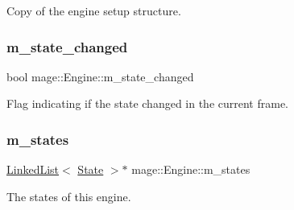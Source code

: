 Copy of the engine setup structure. \hypertarget{classmage_1_1_engine_a2f6f5d3708b6d2a9a4305425e797f309}{}\label{classmage_1_1_engine_a2f6f5d3708b6d2a9a4305425e797f309} 
\subsubsection{\texorpdfstring{m\+\_\+state\+\_\+changed}{m\_state\_changed}}
{\footnotesize\ttfamily bool mage\+::\+Engine\+::m\+\_\+state\+\_\+changed\hspace{0.3cm}{\ttfamily [private]}}

Flag indicating if the state changed in the current frame. \hypertarget{classmage_1_1_engine_a22f39406fcbbbac266baabb14b4e3d70}{}\label{classmage_1_1_engine_a22f39406fcbbbac266baabb14b4e3d70} 
\subsubsection{\texorpdfstring{m\+\_\+states}{m\_states}}
{\footnotesize\ttfamily \hyperlink{classmage_1_1_linked_list}{Linked\+List}$<$ \hyperlink{classmage_1_1_state}{State} $>$$\ast$ mage\+::\+Engine\+::m\+\_\+states\hspace{0.3cm}{\ttfamily [private]}}

The states of this engine. 